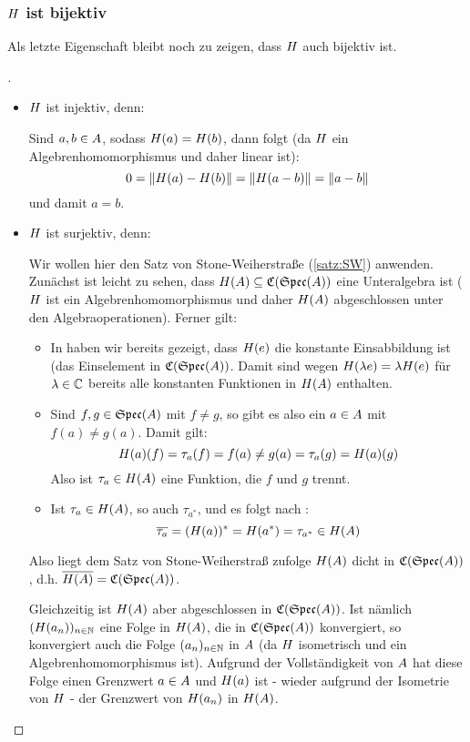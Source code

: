 \subsubsection{$H$ ist bijektiv}\label{sec:Bijektiv}

Als letzte Eigenschaft bleibt noch zu zeigen, dass $H$ auch bijektiv ist.

\begin{proof}[]\ 

\begin{itemize}
\item $H$ ist injektiv, denn:

Sind $a, b \in A$, sodass $H(a) = H(b)$, dann folgt (da $H$ ein Algebrenhomomorphismus und daher linear ist):
	\[0 = \left\lVert H(a) - H(b)\right\rVert = \left\lVert H(a-b)\right\rVert = \left\lVert a-b\right\rVert\]
und damit $a = b$.

\item $H$ ist surjektiv, denn:

Wir wollen hier den Satz von Stone-Weiherstraße (\ref{satz:SW}) anwenden. Zunächst ist leicht zu sehen, dass $H(A) \subseteq \mathfrak{C}(\mathfrak{Spec}(A))$ eine Unteralgebra ist ($H$ ist ein Algebrenhomomorphismus und daher $H(A)$ abgeschlossen unter den Algebraoperationen). Ferner gilt:
\begin{itemize}
	\item In  haben wir bereits gezeigt, dass $H(e)$ die konstante Einsabbildung ist (das Einselement in $\mathfrak{C}(\mathfrak{Spec}(A))$. Damit sind wegen $H(\lambda e) = \lambda H(e)$ für $\lambda \in \mathbb{C}$ bereits alle konstanten Funktionen in $H(A)$ enthalten.
	\item Sind $f, g \in \mathfrak{Spec}(A)$ mit $f \neq g$, so gibt es also ein $a \in A$ mit $f(a) \neq g(a)$. Damit gilt:
		\[H(a)(f) = \tau_a(f) = f(a) \neq g(a) = \tau_a(g) = H(a)(g)\]
		Also ist $\tau_a \in H(A)$ eine Funktion, die $f$ und $g$ trennt.
	\item Ist $\tau_a \in H(A)$, so auch $\tau_{a^*}$, und es folgt nach :
		\[\overline{\tau_a} = (H(a))^* = H(a^*) = \tau_{a^*} \in H(A)\]
\end{itemize}
Also liegt dem Satz von Stone-Weiherstraß zufolge $H(A)$ dicht in $\mathfrak{C}(\mathfrak{Spec}(A))$, d.h. $\overline{H(A)} = \mathfrak{C}(\mathfrak{Spec}(A))$.

Gleichzeitig ist $H(A)$ aber abgeschlossen in $\mathfrak{C}(\mathfrak{Spec}(A))$. Ist nämlich $(H(a_n))_{n\in\mathbb{N}}$ eine Folge in $H(A)$, die in $\mathfrak{C}(\mathfrak{Spec}(A))$ konvergiert, so konvergiert auch die Folge $(a_n)_{n\in\mathbb{N}}$ in $A$ (da $H$ isometrisch und ein Algebrenhomomorphismus ist). Aufgrund der Vollständigkeit von $A$ hat diese Folge einen Grenzwert $a \in A$ und $H(a)$ ist - wieder aufgrund der Isometrie von $H$ - der Grenzwert von $H(a_n)$ in $H(A)$. 


\end{itemize}
\end{proof}
